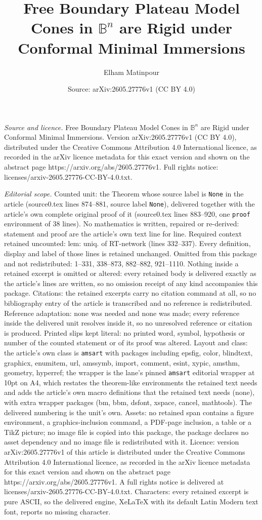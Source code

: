 \documentclass[10pt,a4paper]{amsart}
\title[Free Boundary Plateau Model Cones in $\mathbb{B}^n$ are Rigi]{Free Boundary Plateau Model Cones in $\mathbb{B}^n$ are Rigid under Conformal Minimal Immersions}
\author{Elham Matinpour}
\date{Source: arXiv:2605.27776v1 (CC BY 4.0)}
\begin{document}
\maketitle

\noindent\emph{Source and licence.} Free Boundary Plateau Model Cones in $\mathbb{B}^n$ are Rigid under Conformal Minimal Immersions. Version arXiv:2605.27776v1 (CC BY 4.0), distributed under the Creative Commons Attribution 4.0 International licence, as recorded in the arXiv licence metadata for this exact version and shown on the abstract page https://arxiv.org/abs/2605.27776v1. Full rights notice: licenses/arxiv-2605.27776-CC-BY-4.0.txt.\par\smallskip

\noindent\textit{Editorial scope.} Counted unit: the Theorem whose source label is \texttt{None} in the article (source0.tex lines 874--881, source label \texttt{None}), delivered together with the article's own complete original proof of it (source0.tex lines 883--920, one \texttt{proof} environment of 38 lines). No mathematics is written, repaired or re-derived: statement and proof are the article's own text line for line. Required context retained uncounted: lem: uniq. of RT-network (lines 332--337). Every definition, display and label of those lines is retained unchanged. Omitted from this package and not redistributed: 1--331, 338--873, 882--882, 921--1110. Nothing inside a retained excerpt is omitted or altered: every retained body is delivered exactly as the article's lines are written, so no omission receipt of any kind accompanies this package. Citations: the retained excerpts carry no citation command at all, so no bibliography entry of the article is transcribed and no reference is redistributed. Reference adaptation: none was needed and none was made; every reference inside the delivered unit resolves inside it, so no unresolved reference or citation is produced. Printed slips kept literal: no printed word, symbol, hypothesis or number of the counted statement or of its proof was altered. Layout and class: the article's own class is \texttt{amsart} with packages including epsfig, color, blindtext, graphicx, enumitem, url, amssymb, import, comment, esint, xypic, amsthm, geometry, hyperref; the wrapper is the lane's pinned \texttt{amsart} editorial wrapper at 10pt on A4, which restates the theorem-like environments the retained text needs and adds the article's own macro definitions that the retained text needs (none), with extra wrapper packages (bm, bbm, dsfont, xspace, cancel, mathtools). The delivered numbering is the unit's own. Assets: no retained span contains a figure environment, a graphics-inclusion command, a PDF-page inclusion, a table or a TikZ picture; no image file is copied into this package, the package declares no asset dependency and no image file is redistributed with it. Licence: version arXiv:2605.27776v1 of this article is distributed under the Creative Commons Attribution 4.0 International licence, as recorded in the arXiv licence metadata for this exact version and shown on the abstract page https://arxiv.org/abs/2605.27776v1. A full rights notice is delivered at licenses/arxiv-2605.27776-CC-BY-4.0.txt. Characters: every retained excerpt is pure ASCII, so the delivered engine, XeLaTeX with its default Latin Modern text font, reports no missing character.
\end{document}
